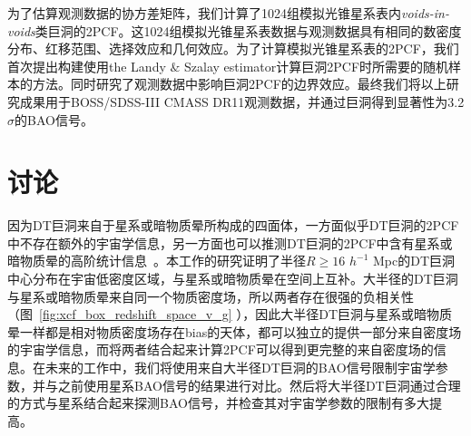 为了估算观测数据的协方差矩阵，我们计算了1024组模拟光锥星系表内\textit{voids-in-voids}类巨洞的2PCF。这1024组模拟光锥星系表数据与观测数据具有相同的数密度分布、红移范围、选择效应和几何效应。为了计算模拟光锥星系表的2PCF，我们首次提出构建使用the Landy $\&$ Szalay estimator计算巨洞2PCF时所需要的随机样本的方法。同时研究了观测数据中影响巨洞2PCF的边界效应。最终我们将以上研究成果用于BOSS/SDSS-III CMASS DR11观测数据，并通过巨洞得到显著性为3.2$\sigma$的BAO信号。



\section{讨论}

因为DT巨洞来自于星系或暗物质晕所构成的四面体，一方面似乎DT巨洞的2PCF中不存在额外的宇宙学信息，另一方面也可以推测DT巨洞的2PCF中含有星系或暗物质晕的高阶统计信息~\cite{W79}。本工作的研究证明了半径$R \geq 16$ $h^{-1}$ Mpc的DT巨洞中心分布在宇宙低密度区域，与星系或暗物质晕在空间上互补。大半径的DT巨洞与星系或暗物质晕来自同一个物质密度场，所以两者存在很强的负相关性（图~\ref{fig:xcf_box_redshift_space_v_g} ），因此大半径DT巨洞与星系或暗物质晕一样都是相对物质密度场存在bias的天体，都可以独立的提供一部分来自密度场的宇宙学信息，而将两者结合起来计算2PCF可以得到更完整的来自密度场的信息。在未来的工作中，我们将使用来自大半径DT巨洞的BAO信号限制宇宙学参数，并与之前使用星系BAO信号的结果进行对比。然后将大半径DT巨洞通过合理的方式与星系结合起来探测BAO信号，并检查其对宇宙学参数的限制有多大提高。

